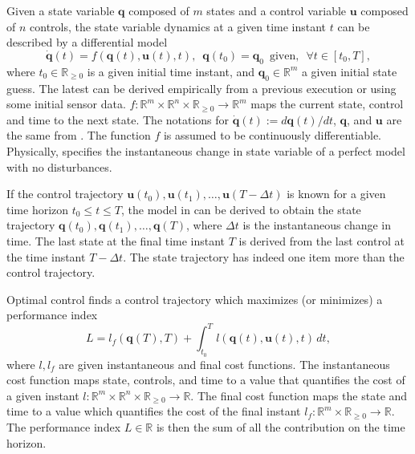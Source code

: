 Given a state variable $\mathbf{q}$ composed of $m$ states and a control variable $\mathbf{u}$ composed of $n$ controls, the state variable dynamics at a given time instant $t$ can be described by a differential model
\begin{equation}\label{eq:optimization:perfect-model}
    \dot{\mathbf{q}}(t)=f(\mathbf{q}(t),\mathbf{u}(t),t),\,\,\,\mathbf{q}(t_0)=\mathbf{q}_0\,\,\,\text{given},\,\,\,\forall t\in[t_0,T],
\end{equation}
where $t_0\in\mathbb{R}_{\geq 0}$ is a given initial time instant, and $\mathbf{q}_0\in\mathbb{R}^m$ a given initial state guess. The latest can be derived empirically from a previous execution or using some initial sensor data. $f:\mathbb{R}^m\times\mathbb{R}^n\times\mathbb{R}_{\geq 0}\rightarrow\mathbb{R}^m$ maps the current state, control and time to the next state. The notations for $\dot{\mathbf{q}}(t):=d\mathbf{q}(t)/dt$, $\mathbf{q}$, and $\mathbf{u}$ are the same from . The function $f$ is assumed to be continuously differentiable. Physically,  specifies the instantaneous change in state variable of a perfect model with no disturbances.

If the control trajectory $\mathbf{u}(t_0),\mathbf{u}(t_1),\dots,\mathbf{u}(T-\Delta t)$ is known for a given time horizon $t_0\leq t\leq T$, the model in  can be derived to obtain the state trajectory $\mathbf{q}(t_0),\mathbf{q}(t_1),\dots,\mathbf{q}(T)$, where $\Delta t$ is the instantaneous change in time. The last state at the final time instant $T$ is derived from the last control at the time instant $T-\Delta t$. The state trajectory has indeed one item more than the control trajectory.

Optimal control finds a control trajectory which maximizes (or minimizes) a performance index
\begin{equation}
    L=l_f(\mathbf{q}(T),T)+\int_{t_0}^{T}{l(\mathbf{q}(t),\mathbf{u}(t),t)\,dt},
\end{equation}
where $l,l_f$ are given instantaneous and final cost functions. The instantaneous cost function maps state, controls, and time to a value that quantifies the cost of a given instant $l:\mathbb{R}^m\times\mathbb{R}^n\times\mathbb{R}_{\geq 0}\rightarrow\mathbb{R}$. The final cost function maps the state and time to a value which quantifies the cost of the final instant $l_f:\mathbb{R}^m\times\mathbb{R}_{\geq 0}\rightarrow\mathbb{R}$. The performance index $L\in\mathbb{R}$ is then the sum of all the contribution on the time horizon.

